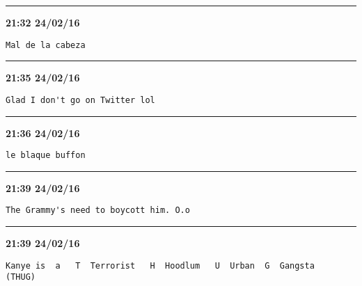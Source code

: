 \hrule%

\begin{adjustwidth}{0cm}{0cm}
\footnotesize \textbf{21:32 24/02/16}

\begin{lstlisting}[breaklines, breakatwhitespace, basicstyle=\small, frame=leftline]
Mal de la cabeza
\end{lstlisting}
\end{adjustwidth}

\hrule%

\begin{adjustwidth}{0cm}{0cm}
\footnotesize \textbf{21:35 24/02/16}

\begin{lstlisting}[breaklines, breakatwhitespace, basicstyle=\small, frame=leftline]
Glad I don't go on Twitter lol
\end{lstlisting}
\end{adjustwidth}

\hrule%

\begin{adjustwidth}{0cm}{0cm}
\footnotesize \textbf{21:36 24/02/16}

\begin{lstlisting}[breaklines, breakatwhitespace, basicstyle=\small, frame=leftline]
le blaque buffon
\end{lstlisting}
\end{adjustwidth}

\hrule%

\begin{adjustwidth}{0cm}{0cm}
\footnotesize \textbf{21:39 24/02/16}

\begin{lstlisting}[breaklines, breakatwhitespace, basicstyle=\small, frame=leftline]
The Grammy's need to boycott him. O.o
\end{lstlisting}
\end{adjustwidth}

\hrule%

\begin{adjustwidth}{0cm}{0cm}
\footnotesize \textbf{21:39 24/02/16}

\begin{lstlisting}[breaklines, breakatwhitespace, basicstyle=\small, frame=leftline]
Kanye is  a   T  Terrorist   H  Hoodlum   U  Urban  G  Gangsta   (THUG)
\end{lstlisting}
\end{adjustwidth}

